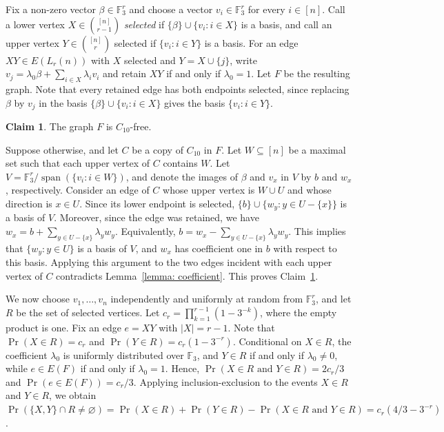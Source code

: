 \documentclass[11pt]{article}
\makeatletter
\theoremstyle{plain}
\theoremstyle{definition}
\newtheorem{claim}[theorem]{Claim}
\renewenvironment{proof}[1][\proofname]
{\par\pushQED{\qed}
	\normalfont\topsep6\p@\@plus6\p@\relax\trivlist
	\item[\hskip\labelsep\bfseries#1\@addpunct{.}]
	\ignorespaces}
{\popQED\endtrivlist\@endpefalse}
\makeatother
\begin{document}
\begin{proof}[Proof of Proposition~\ref{proposition: layer_lower}]

Fix a non-zero vector $\beta\in\mathbb{F}_3^r$ and choose a vector
$v_i\in\mathbb{F}_3^r$ for every $i\in[n]$.
Call a lower vertex $X \in \binom{[n]}{r-1}$ \emph{selected} if $\{\beta\} \cup \{v_i: i \in X\}$ is a basis, and call an upper vertex $Y \in \binom{[n]}r$ selected if $\{v_i: i \in Y\}$ is a basis. 
For an edge $XY \in E(L_r(n))$ with  $X$ selected and $Y = X \cup \{j\}$, write $v_j = \lambda_0 \beta + \sum_{i \in X} \lambda_i v_i$ and retain $XY$ if and only if $\lambda_0 = 1$. 
Let $F$ be the resulting graph. 
Note that every retained edge has both endpoints selected, since replacing $\beta$ by $v_j$ in the basis $\{\beta\} \cup \{v_i: i \in X\}$ gives the basis $\{v_i: i \in Y\}$.

\begin{claim}\label{claim: coefficient_free} The graph $F$ is $C_{10}$-free.

Suppose otherwise, and let $C$ be a copy of $C_{10}$ in $F$. 
Let $W \subseteq [n]$ be a maximal set such that each upper vertex of $C$ contains $W$.
Let $V = \mathbb{F}_3^r/\operatorname{span}(\{v_i: i \in W\})$, and denote the images of $\beta$ and $v_x$ in $V$ by $b$ and $w_x$, respectively. 
Consider an edge of $C$ whose upper vertex is $W \cup U$ and whose direction is $x \in U$. 
Since its lower endpoint is selected, $\{b\}\cup\{w_y: y \in U - \{x\}\}$ is a basis of $V$. 
Moreover, since the edge was retained, we have $w_x = b + \sum_{y \in U-\{x\}} \lambda_y w_y$. 
Equivalently, $b = w_x - \sum_{y \in U-\{x\}} \lambda_y w_y$. 
This implies that $\{w_y: y \in U\}$ is a basis of $V$, and $w_x$ has coefficient one in $b$ with respect to this basis. 
Applying this argument to the two edges incident with each upper vertex of $C$ contradicts Lemma~\ref{lemma: coefficient}. 
This proves Claim~\ref{claim: coefficient_free}.

\end{claim}

We now choose $v_1, \ldots, v_n$ independently and uniformly at random from $\mathbb{F}_3^r$, and let $R$ be the set of selected vertices. 
Let $c_r = \prod_{k=1}^{r-1}(1 - 3^{-k})$, where the empty product is one. 
Fix an edge $e = XY$ with $|X| = r - 1$. 
Note that $\operatorname{Pr}(X \in R) = c_r$ and $\operatorname{Pr}(Y \in R) = c_r(1 - 3^{-r})$. 
Conditional on $X \in R$, the coefficient $\lambda_0$ is uniformly distributed over $\mathbb{F}_3$, and $Y \in R$ if and only if $\lambda_0 \neq 0$, while $e \in E(F)$ if and only if $\lambda_0 = 1$. 
Hence, $\operatorname{Pr}(X \in R\text{ and }Y\in R) = 2c_r/3$ and $\operatorname{Pr}(e \in E(F))=c_r/3$. 
Applying inclusion-exclusion to the events $X \in R$ and $Y \in R$, we obtain
$\operatorname{Pr}(\{X,Y\} \cap R \neq \varnothing) = \operatorname{Pr}(X \in R) + \operatorname{Pr}(Y \in R) - \operatorname{Pr}(X \in R\text{ and }Y \in R) = c_r(4/3 - 3^{-r})$.


\end{proof}
\end{document}
